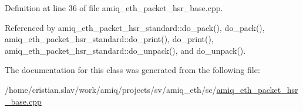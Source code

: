 Definition at line 36 of file amiq\_\-eth\_\-packet\_\-hsr\_\-base.cpp.

Referenced by amiq\_\-eth\_\-packet\_\-hsr\_\-standard::do\_\-pack(), do\_\-pack(), amiq\_\-eth\_\-packet\_\-hsr\_\-standard::do\_\-print(), do\_\-print(), amiq\_\-eth\_\-packet\_\-hsr\_\-standard::do\_\-unpack(), and do\_\-unpack().

The documentation for this class was generated from the following file:\begin{DoxyCompactItemize}
\item 
/home/cristian.slav/work/amiq/projects/sv/amiq\_\-eth/sc/\hyperlink{amiq__eth__packet__hsr__base_8cpp}{amiq\_\-eth\_\-packet\_\-hsr\_\-base.cpp}\end{DoxyCompactItemize}
